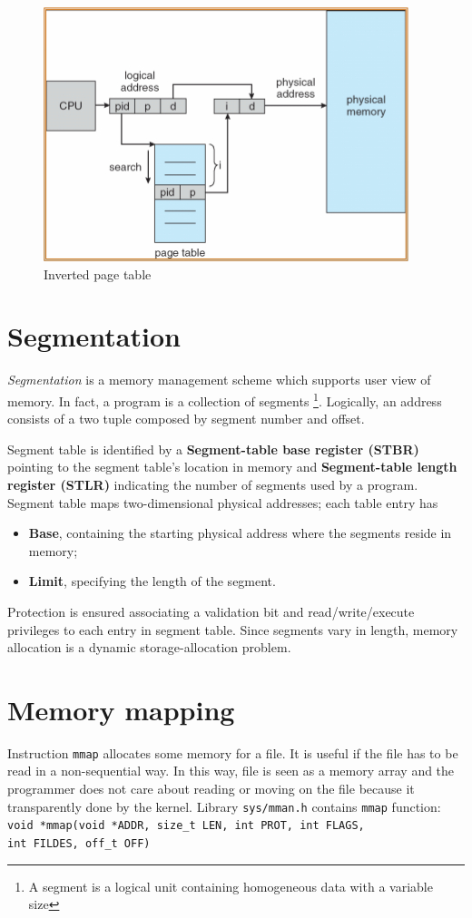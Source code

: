 \begin{figure}[hbtp]
\centering
\includegraphics[scale=0.4]{images/memory_management/inverted_pagetable.jpg}
\caption{Inverted page table}
\end{figure}

\section{Segmentation}
\emph{Segmentation} is a memory management scheme which supports user view of memory. In fact, a program is a collection of segments \footnote{A segment is a logical unit containing homogeneous data with a variable size}. Logically, an address consists of a two tuple composed by segment number and offset.

Segment table is identified by a \textbf{Segment-table base register (STBR)}  pointing to the segment table's location in memory and \textbf{Segment-table length register (STLR)} indicating the number of segments used by a program. Segment table maps two-dimensional physical addresses; each table entry has
\begin{itemize}
\item \textbf{Base}, containing the starting physical address where the segments reside in memory;
\item \textbf{Limit}, specifying the length of the segment.
\end{itemize}

Protection is ensured associating a validation bit and read/write/execute privileges to each entry in segment table. Since segments vary in length, memory allocation is a dynamic storage-allocation problem.

\section*{Memory mapping}
Instruction \texttt{mmap} allocates some memory for a file. It is useful if the file has to be read in a non-sequential way. In this way, file is seen as a memory array and the programmer does not care about reading or moving on the file because it transparently done by the kernel.
Library \texttt{sys/mman.h} contains \texttt{mmap} function:
\newline
\texttt{void *mmap(void *ADDR, size\_t LEN, int PROT, int FLAGS, \\ int FILDES, off\_t OFF)}

